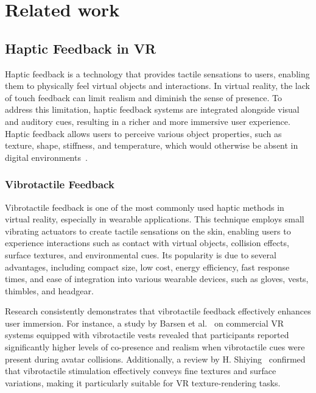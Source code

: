 \chapter{Related work} %

\label{Chapter2} %


\section{Haptic Feedback in VR}
Haptic feedback is a technology that provides tactile sensations to users, enabling them to physically feel virtual objects and interactions. In virtual reality, the lack of touch feedback can limit realism and diminish the sense of presence. To address this limitation, haptic feedback systems are integrated alongside visual and auditory cues, resulting in a richer and more immersive user experience. Haptic feedback allows users to perceive various object properties, such as texture, shape, stiffness, and temperature, which would otherwise be absent in digital environments~\cite{doi:10.34133/research.0333}.

\subsection{Vibrotactile Feedback}
Vibrotactile feedback is one of the most commonly used haptic methods in virtual reality, especially in wearable applications. This technique employs small vibrating actuators to create tactile sensations on the skin, enabling users to experience interactions such as contact with virtual objects, collision effects, surface textures, and environmental cues. Its popularity is due to several advantages, including compact size, low cost, energy efficiency, fast response times, and ease of integration into various wearable devices, such as gloves, vests, thimbles, and headgear.

Research consistently demonstrates that vibrotactile feedback effectively enhances user immersion. For instance, a study by Barsen et al.~\cite{10.1007/978-3-030-06134-0_25} on commercial VR systems equipped with vibrotactile vests revealed that participants reported significantly higher levels of co-presence and realism when vibrotactile cues were present during avatar collisions. Additionally, a review by H. Shiying~\cite{10.54254/2753-8818/17/20240650} confirmed that vibrotactile stimulation effectively conveys fine textures and surface variations, making it particularly suitable for VR texture-rendering tasks.

